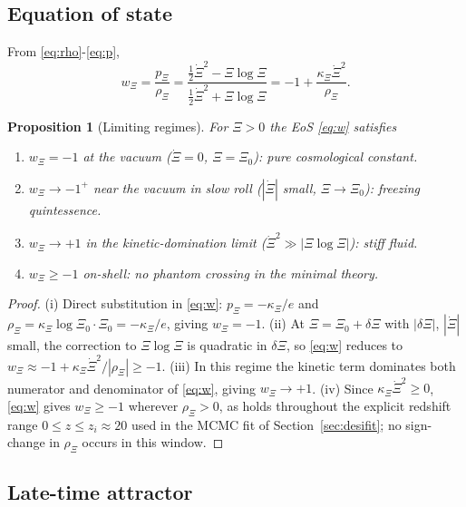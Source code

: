 \documentclass[11pt,reqno]{amsart}
\theoremstyle{plain}
\newtheorem{proposition}[theorem]{Proposition}
\theoremstyle{definition}
\theoremstyle{remark}
\begin{document}
\subsection{Equation of state}

From \eqref{eq:rho}-\eqref{eq:p},
\begin{equation}\label{eq:w}
  w_\Xi=\frac{p_\Xi}{\rho_\Xi}=\frac{\tfrac{1}{2}\dot\Xi^{2}-\Xi\log\Xi}{\tfrac{1}{2}\dot\Xi^{2}+\Xi\log\Xi}
  =-1+\frac{\kappa_\Xi\dot\Xi^{2}}{\rho_\Xi}.
\end{equation}

\begin{proposition}[Limiting regimes]\label{prop:limits}
For $\Xi>0$ the EoS \eqref{eq:w} satisfies
\begin{enumerate}
  \item[(i)] $w_\Xi=-1$ at the vacuum ($\dot\Xi=0$, $\Xi=\Xi_0$): pure cosmological constant.
  \item[(ii)] $w_\Xi\to-1^{+}$ near the vacuum in slow roll ($|\dot\Xi|$ small, $\Xi\to\Xi_0$): freezing quintessence.
  \item[(iii)] $w_\Xi\to +1$ in the kinetic-domination limit ($\dot\Xi^{2}\gg|\Xi\log\Xi|$): stiff fluid.
  \item[(iv)] $w_\Xi\ge-1$ on-shell: no phantom crossing in the minimal theory.
\end{enumerate}
\end{proposition}

\begin{proof}
(i) Direct substitution in \eqref{eq:w}: $p_\Xi=-\kappa_\Xi/e$ and $\rho_\Xi=\kappa_\Xi\log\Xi_0\cdot\Xi_0=-\kappa_\Xi/e$,
giving $w_\Xi=-1$. (ii) At $\Xi=\Xi_0+\delta\Xi$ with $|\delta\Xi|$, $|\dot\Xi|$ small, the
correction to $\Xi\log\Xi$ is quadratic in $\delta\Xi$, so \eqref{eq:w} reduces to
$w_\Xi\approx-1+\kappa_\Xi\dot\Xi^{2}/|\rho_\Xi|\ge-1$.
(iii) In this regime the kinetic term dominates both numerator and denominator of \eqref{eq:w},
giving $w_\Xi\to+1$. (iv) Since $\kappa_\Xi\dot\Xi^{2}\ge0$, \eqref{eq:w} gives $w_\Xi\ge-1$
wherever $\rho_\Xi>0$, as holds throughout the explicit redshift range
$0\le z\le z_i\approx 20$ used in the MCMC fit of Section~\ref{sec:desifit};
no sign-change in $\rho_\Xi$ occurs in this window.
\end{proof}

\subsection{Late-time attractor}
\end{document}
